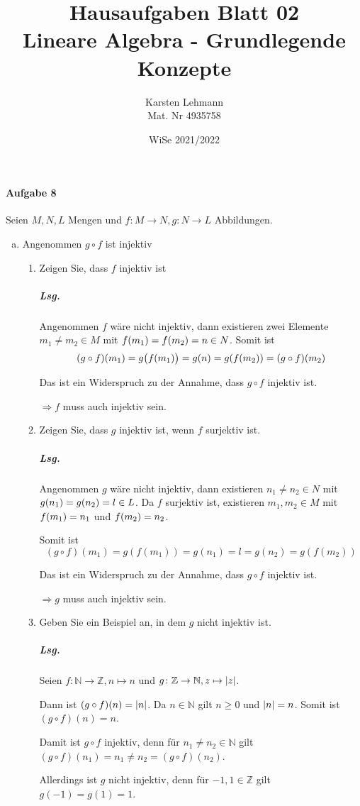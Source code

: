 \documentclass{scrreprt}
\author{Karsten Lehmann\\Mat. Nr 4935758}
\date{WiSe 2021/2022}
\title{Hausaufgaben Blatt 02\\Lineare Algebra - Grundlegende Konzepte}
\begin{document}
\paragraph{Aufgabe 8} Seien $M, N, L$ Mengen und
$f \colon M \to N, g \colon N \to L$ Abbildungen.
\begin{enumerate}[(a)]
\item Angenommen $g \circ f$ ist injektiv
  \begin{enumerate}[label={(a\arabic*)}]
  \item Zeigen Sie, dass $f$ injektiv ist

    \subparagraph{Lsg.} Angenommen $f$ wäre nicht injektiv,
    dann existieren zwei Elemente $m_1 \ne m_2 \in M$ mit
    $f\qty(m_1) = f\qty(m_2) = n \in N$.
    Somit ist
    \[
      (g \circ f)\qty(m_1) = g\qty\big(f(m_1)) = g(n) = g\qty(f(m_2))
      = (g \circ f)(m_2)
    \]

    Das ist ein Widerspruch zu der Annahme, dass $g \circ f$ injektiv ist.

    $\Rightarrow f$ muss auch injektiv sein.
  \item Zeigen Sie, dass $g$ injektiv ist, wenn $f$ surjektiv ist.

    \subparagraph{Lsg.} Angenommen $g$ wäre nicht injektiv,
    dann existieren $n_1 \ne n_2 \in N$ mit $g\qty(n_1) = g\qty(n_2) = l \in L$.
    Da $f$ surjektiv ist, existieren $m_1, m_2 \in M$ mit $f\qty(m_1) = n_1$
    und $f\qty(m_2) = n_2$.

    Somit ist
    \[
      (g \circ f)(m_1) = g(f(m_1)) = g(n_1) = l = g(n_2) = g(f(m_2))
    \]

    Das ist ein Widerspruch zu der Annahme, dass $g \circ f$ injektiv ist.

    $\Rightarrow g$ muss auch injektiv sein.

  \item Geben Sie ein Beispiel an, in dem $g$ nicht injektiv ist.

    \subparagraph{Lsg.} Seien $f \colon \mathbb{N} \to \mathbb{Z}, n \mapsto n$
    und $g \colon \mathbb{Z} \to \mathbb{N}, z \mapsto \abs{z}$.

    Dann ist $(g \circ f)(n) = \abs{n}$.
    Da $n \in \mathbb{N}$ gilt $n \geq 0$ und $\abs{n} = n$.
    Somit ist $(g \circ f)(n) = n$.

    Damit ist $g \circ f$ injektiv, denn für $n_1 \ne n_2 \in \mathbb{N}$ gilt
    $(g \circ f)(n_1) = n_1 \ne n_2 = (g \circ f)(n_2)$.

    Allerdings ist $g$ nicht injektiv, denn für $-1, 1 \in \mathbb{Z}$ gilt
    $g(-1) = g(1) = 1$.
  \end{enumerate}


\end{enumerate}
\end{document}

